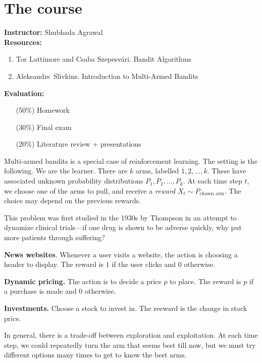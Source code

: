 \chapter*{The course}

\textbf{Instructor:} Shubhada Agrawal
\\[1em]
\textbf{Resources:}
\begin{enumerate}
    \item Tor Lattimore and Csaba Szepesvári. Bandit Algorithms
    \item Aleksandrs~Slivkins. Introduction to Multi-Armed Bandits
\end{enumerate}
\vspace{1em}
\textbf{Evaluation:}
\begin{itemize}
    \item[(50\%)] Homework
    \item[(30\%)] Final exam
    \item[(20\%)] Literature review + presentations
\end{itemize}

Multi-armed bandits is a special case of reinforcement learning.
The setting is the following.
We are the learner.
There are $k$ arms, labelled $1, 2, \dots, k$.
These have associated unknown probability distributions
$P_1, P_2, \dots, P_k$.
At each time step $t$, we choose one of the arms to pull, and receive a
\emph{reward} $X_t \sim P_{\text{chosen arm}}$.
The choice may depend on the previous rewards.

This problem was first studied in the 1930s by Thompson in an attempt to
dynamize clinical trials---if one drug is shown to be adverse quickly, why
put more patients through suffering?
\begin{examples}
    \item \textbf{News websites}.
        Whenever a user visits a website, the action is choosing a header
        to display.
        The reward is $1$ if the user clicks and $0$ otherwise.
    \item \textbf{Dynamic pricing.}
        The action is to decide a price $p$ to place.
        The reward is $p$ if a purchase is made and $0$ otherwise.
    \item \textbf{Investments.}
        Choose a stock to invest in.
        The reeward is the change in stock price.
\end{examples}
In general, there is a trade-off between exploration and exploitation.
At each time step, we could repeatedly turn the arm that seems best till
now, but we must try different options many times to get to know the best
arms.


